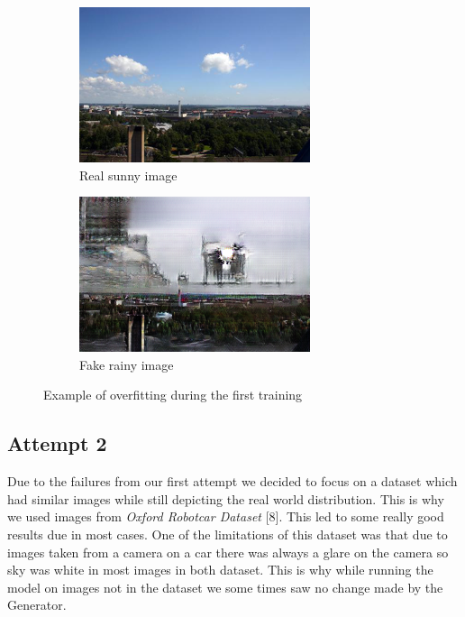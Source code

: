 \documentclass{article}
\begin{document}
\begin{figure}
	\centering
	\begin{subfigure}{.7\textwidth}
	\centering
		\includegraphics[width=.9\linewidth]{images/v1_real_A.png}
		\caption{Real sunny image}
	\end{subfigure}
	\begin{subfigure}{.7\textwidth}
		\centering
		\includegraphics[width=.9\linewidth]{images/v1_fake_B.png}
		\caption{Fake rainy image}
	\end{subfigure}
	\caption{Example of overfitting during the first training}
	\label{fig:v1_failure}
\end{figure}
\raggedbottom
\subsection{Attempt 2}

Due to the failures from our first attempt we decided to focus on a dataset which had similar images while still depicting the real world distribution. This is why we used images from \textit{Oxford Robotcar Dataset} [8]. This led to some really good results due in most cases. One of the limitations of this dataset was that due to images taken from a camera on a car there was always a glare on the camera so sky was white in most images in both dataset. This is why while running the model on images not in the dataset we some times saw no change made by the Generator.
\end{document}
